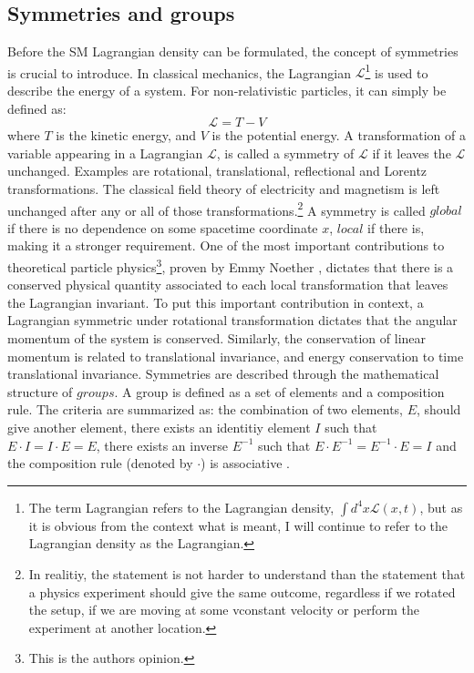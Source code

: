 \subsection*{Symmetries and groups}\label{sec:symmetries}
\noindent\justify
Before the SM Lagrangian density can be formulated, the concept of symmetries is crucial to introduce. 
In classical mechanics, the Lagrangian $\mathcal{L}$\footnote{The term Lagrangian refers to the Lagrangian density, $\int d^{4}x\mathcal{L}(x,t)$, but as it is obvious from the context what is meant, I will continue to refer to the Lagrangian density as the Lagrangian. } is used to describe the energy of a system. 
For non-relativistic particles, it can simply be defined as:
\begin{equation}
\mathcal{L}=T-V
\end{equation}
where $T$ is the kinetic energy, and $V$ is the potential energy. 
A transformation of a variable appearing in a Lagrangian $\mathcal{L}$, is called a symmetry of $\mathcal{L}$ if it leaves the $\mathcal{L}$ unchanged. 
Examples are rotational, translational, reflectional and Lorentz transformations. 
The classical field theory of electricity and magnetism is left unchanged after any or all of those transformations.\footnote{In realitiy, the statement is not harder to understand than the statement that a physics experiment should give the same outcome, regardless if we rotated the setup, if we are moving at some vconstant velocity or perform the experiment at another location.} 
A symmetry is called $global$ if there is no dependence on some spacetime coordinate $x$, $local$ if there is, making it a stronger requirement. 
One of the most important contributions to theoretical particle physics\footnote{This is the authors opinion.}, proven by Emmy Noether \cite{Noether1918}, dictates that there is a conserved physical quantity associated to each local transformation that leaves the Lagrangian invariant.   
To put this important contribution in context, a Lagrangian symmetric under rotational transformation dictates that the angular momentum of the system is conserved.
Similarly, the conservation of linear momentum is related to translational invariance, and energy conservation to time translational invariance.  
Symmetries are described through the mathematical structure of $groups$. 
A group is defined as a set of elements and a composition rule. 
The criteria are summarized as: the combination of two elements, $E$, should give another element, there exists an identitiy element $I$ such that $E\cdot I=I\cdot E=E$, there exists an inverse $E^{-1}$ such that $E\cdot E^{-1}=E^{-1}\cdot E=I$ and the composition rule (denoted by $\cdot$) is associative \cite{Kane:2244793}.   
